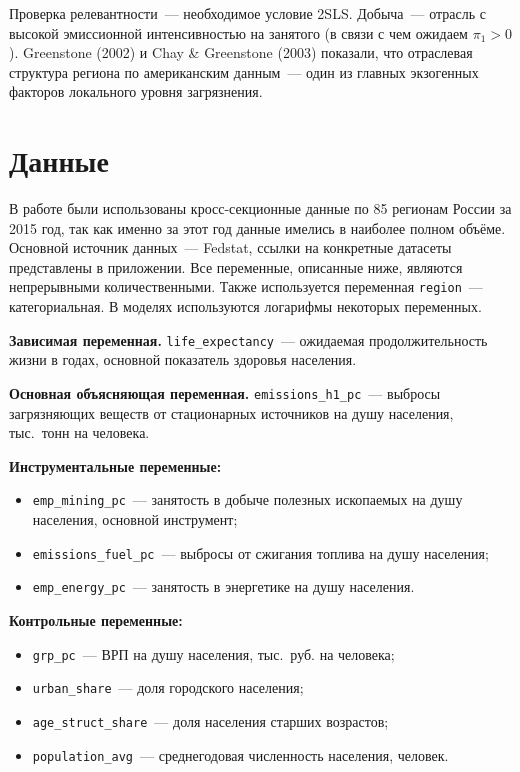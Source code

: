 \documentclass[10pt,a4paper]{article}
\begin{document}
Проверка релевантности~--- необходимое условие 2SLS. Добыча~--- отрасль с высокой эмиссионной интенсивностью на занятого (в связи с чем ожидаем $\pi_1 > 0$). Greenstone (2002) и Chay \& Greenstone (2003) показали, что отраслевая структура региона по американским данным~--- один из главных экзогенных факторов локального уровня загрязнения.

\section*{Данные}

В работе были использованы кросс-секционные данные по 85 регионам России за 2015 год, так как именно за этот год данные имелись в наиболее полном объёме. Основной источник данных~--- Fedstat, ссылки на конкретные датасеты представлены в приложении. Все переменные, описанные ниже, являются непрерывными количественными. Также используется переменная \texttt{region}~--- категориальная. В моделях используются логарифмы некоторых переменных.

\textbf{Зависимая переменная.} \texttt{life\_expectancy}~--- ожидаемая продолжительность жизни в годах, основной показатель здоровья населения.

\textbf{Основная объясняющая переменная.} \texttt{emissions\_h1\_pc}~--- выбросы загрязняющих веществ от стационарных источников на душу населения, тыс.~тонн на человека.

\textbf{Инструментальные переменные:}
\begin{itemize}
  \item \texttt{emp\_mining\_pc}~--- занятость в добыче полезных ископаемых на душу населения, основной инструмент;
  \item \texttt{emissions\_fuel\_pc}~--- выбросы от сжигания топлива на душу населения;
  \item \texttt{emp\_energy\_pc}~--- занятость в энергетике на душу населения.
\end{itemize}

\textbf{Контрольные переменные:}
\begin{itemize}
  \item \texttt{grp\_pc}~--- ВРП на душу населения, тыс.~руб. на человека;
  \item \texttt{urban\_share}~--- доля городского населения;
  \item \texttt{age\_struct\_share}~--- доля населения старших возрастов;
  \item \texttt{population\_avg}~--- среднегодовая численность населения, человек.
\end{itemize}
\end{document}
